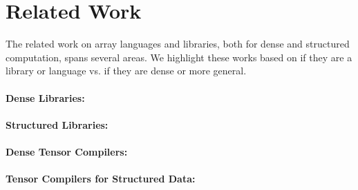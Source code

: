 \section{Related Work}

The related work on array languages and libraries, both for dense and structured computation, spans several areas.
%
We highlight these works based on if they are a library or language vs. if they are dense or more general.

\paragraph{Dense Libraries:}

\paragraph{Structured Libraries:}


\paragraph{Dense Tensor Compilers:}

\paragraph{Tensor Compilers for Structured Data:}




